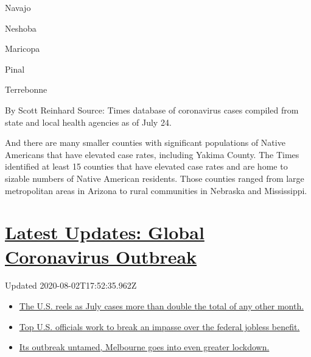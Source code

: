 Navajo

Neshoba

Maricopa

Pinal

Terrebonne

By Scott Reinhard \textbar{} Source: Times database of coronavirus cases
compiled from state and local health agencies as of July 24.

And there are many smaller counties with significant populations of
Native Americans that have elevated case rates, including Yakima County.
The Times identified at least 15 counties that have elevated case rates
and are home to sizable numbers of Native American residents. Those
counties ranged from large metropolitan areas in Arizona to rural
communities in Nebraska and Mississippi.

\hypertarget{latest-updates-global-coronavirus-outbreak}{%
\section{\texorpdfstring{\href{https://www.nytimes.com/2020/08/01/world/coronavirus-covid-19.html?action=click\&pgtype=Article\&state=default\&region=MAIN_CONTENT_1\&context=storylines_live_updates}{Latest
Updates: Global Coronavirus
Outbreak}}{Latest Updates: Global Coronavirus Outbreak}}\label{latest-updates-global-coronavirus-outbreak}}

Updated 2020-08-02T17:52:35.962Z

\begin{itemize}
\tightlist
\item
  \href{https://www.nytimes.com/2020/08/01/world/coronavirus-covid-19.html?action=click\&pgtype=Article\&state=default\&region=MAIN_CONTENT_1\&context=storylines_live_updates\#link-34047410}{The
  U.S. reels as July cases more than double the total of any other
  month.}
\item
  \href{https://www.nytimes.com/2020/08/01/world/coronavirus-covid-19.html?action=click\&pgtype=Article\&state=default\&region=MAIN_CONTENT_1\&context=storylines_live_updates\#link-780ec966}{Top
  U.S. officials work to break an impasse over the federal jobless
  benefit.}
\item
  \href{https://www.nytimes.com/2020/08/01/world/coronavirus-covid-19.html?action=click\&pgtype=Article\&state=default\&region=MAIN_CONTENT_1\&context=storylines_live_updates\#link-2bc8948}{Its
  outbreak untamed, Melbourne goes into even greater lockdown.}
\end{itemize}

